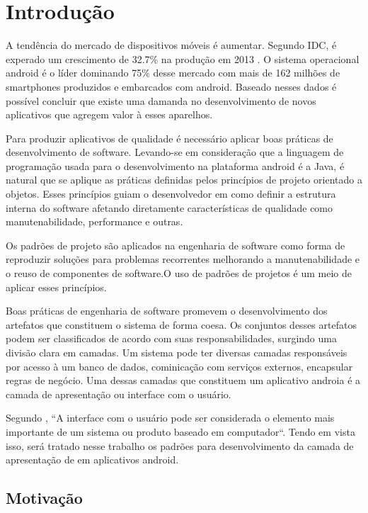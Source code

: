\chapter{Introdução}

A tendência do mercado de dispositivos móveis é aumentar. Segundo IDC,  é
experado um crescimento de 32.7\% na produção em 2013 \cite{idc:a}. O sistema
operacional android é o líder dominando 75\% desse mercado com mais de 162 milhões de
smartphones produzidos e embarcados com android\cite{idc:b}. Baseado nesses
dados é possível concluir que existe uma damanda no desenvolvimento de novos 
aplicativos que agregem valor à esses aparelhos.

Para produzir aplicativos de qualidade é necessário aplicar boas práticas de
desenvolvimento de software. Levando-se em consideração que a linguagem de
programação usada para o desenvolvimento na plataforma android é a Java, é
natural que se aplique as práticas definidas pelos princípios de projeto
orientado a objetos. Esses princípios guiam o desenvolvedor em como definir a
estrutura interna do software afetando diretamente características  de
qualidade como manutenabilidade, performance e outras\cite{tempero-di}.

Os padrões de projeto são aplicados na engenharia de software como forma de
reproduzir  soluções  para problemas recorrentes melhorando a manutenabilidade e
o reuso de componentes de software\cite{gof}.O uso de padrões de projetos
é um meio de aplicar esses princípios. 

Boas práticas de engenharia de software promevem o desenvolvimento dos
artefatos que constituem o sistema de forma coesa. Os conjuntos desses artefatos
podem ser classificados de acordo com suas responsabilidades, surgindo
uma divisão clara em camadas. Um sistema pode ter diversas camadas responsáveis
por acesso à um banco de dados, cominicação com serviços externos, encapsular
regras de negócio. Uma dessas camadas que constituem um aplicativo androia é a
camada de apresentação ou interface com o usuário.
 
Segundo , ``A interface com o usuário pode ser considerada
o elemento mais importante de um sistema ou produto baseado em computador``.
Tendo em vista isso, será tratado nesse trabalho  os padrões para
desenvolvimento da camada de apresentação de em aplicativos android.

\section{Motivação}

